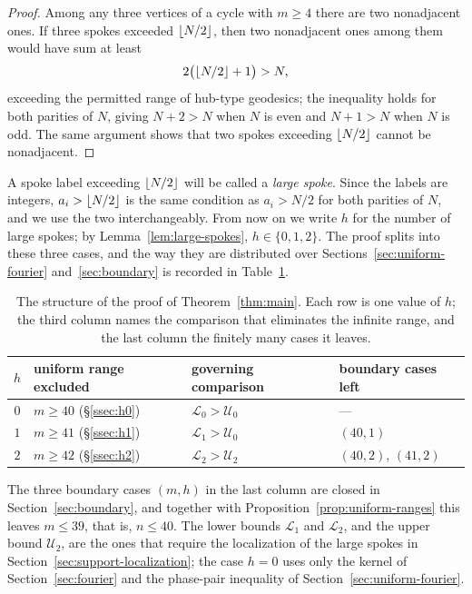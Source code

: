 \documentclass[11pt]{article}
\theoremstyle{definition}
\theoremstyle{remark}
\numberwithin{equation}{section}
\DeclarePairedDelimiter{\floor}{\lfloor}{\rfloor}
\begin{document}
\begin{proof}
Among any three vertices of a cycle with $m\ge4$ there are two nonadjacent ones. If three spokes exceeded $\floor{N/2}$, then two nonadjacent ones among them would have sum at least
\[
  2\bigl(\floor{N/2}+1\bigr)>N,
\]
exceeding the permitted range of hub-type geodesics; the inequality holds for both parities of $N$, giving $N+2>N$ when $N$ is even and $N+1>N$ when $N$ is odd. The same argument shows that two spokes exceeding $\floor{N/2}$ cannot be nonadjacent.
\end{proof}

A spoke label exceeding $\floor{N/2}$ will be called a \emph{large spoke}.
Since the labels are integers, $a_i>\floor{N/2}$ is the same condition as
$a_i>N/2$ for both parities of $N$, and we use the two interchangeably. From now
on we write $h$ for the number of large spokes; by
Lemma~\ref{lem:large-spokes}, $h\in\{0,1,2\}$. The proof splits into these three
cases, and the way they are distributed over Sections~\ref{sec:uniform-fourier}
and~\ref{sec:boundary} is recorded in Table~\ref{tab:case-structure}.

\begin{table}[ht]
\centering
\caption{The structure of the proof of Theorem~\ref{thm:main}. Each row is one
value of $h$; the third column names the comparison that eliminates the
infinite range, and the last column the finitely many cases it
leaves.}\label{tab:case-structure}
\begin{tabular}{@{}clll@{}}
\toprule
$h$ & uniform range excluded & governing comparison & boundary cases left\\
\midrule
$0$ & $m\ge40$ (\S\ref{ssec:h0})
    & $\mathcal L_0>\mathcal U_0$
    & ---\\
$1$ & $m\ge41$ (\S\ref{ssec:h1})
    & $\mathcal L_1>\mathcal U_0$
    & $(40,1)$\\
$2$ & $m\ge42$ (\S\ref{ssec:h2})
    & $\mathcal L_2>\mathcal U_2$
    & $(40,2)$, $(41,2)$\\
\bottomrule
\end{tabular}
\end{table}

The three boundary cases $(m,h)$ in the last column are closed in
Section~\ref{sec:boundary}, and together with
Proposition~\ref{prop:uniform-ranges} this leaves $m\le39$, that is, $n\le40$.
The lower bounds $\mathcal L_1$ and $\mathcal L_2$, and the upper bound
$\mathcal U_2$, are the ones that require the localization of the large spokes
in Section~\ref{sec:support-localization}; the case $h=0$ uses only the kernel
of Section~\ref{sec:fourier} and the phase-pair inequality of
Section~\ref{sec:uniform-fourier}.
\end{document}

